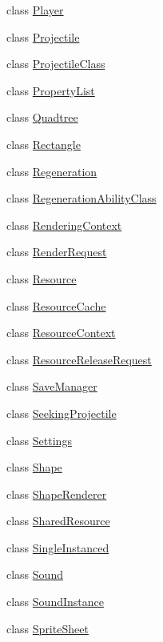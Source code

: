 \begin{DoxyCompactItemize}
\item 
class \hyperlink{classZeta_1_1Player}{Player}
\item 
class \hyperlink{classZeta_1_1Projectile}{Projectile}
\item 
class \hyperlink{classZeta_1_1ProjectileClass}{Projectile\+Class}
\item 
class \hyperlink{classZeta_1_1PropertyList}{Property\+List}
\item 
class \hyperlink{classZeta_1_1Quadtree}{Quadtree}
\item 
class \hyperlink{classZeta_1_1Rectangle}{Rectangle}
\item 
class \hyperlink{classZeta_1_1Regeneration}{Regeneration}
\item 
class \hyperlink{classZeta_1_1RegenerationAbilityClass}{Regeneration\+Ability\+Class}
\item 
class \hyperlink{classZeta_1_1RenderingContext}{Rendering\+Context}
\item 
class \hyperlink{classZeta_1_1RenderRequest}{Render\+Request}
\item 
class \hyperlink{classZeta_1_1Resource}{Resource}
\item 
class \hyperlink{classZeta_1_1ResourceCache}{Resource\+Cache}
\item 
class \hyperlink{classZeta_1_1ResourceContext}{Resource\+Context}
\item 
class \hyperlink{classZeta_1_1ResourceReleaseRequest}{Resource\+Release\+Request}
\item 
class \hyperlink{classZeta_1_1SaveManager}{Save\+Manager}
\item 
class \hyperlink{classZeta_1_1SeekingProjectile}{Seeking\+Projectile}
\item 
class \hyperlink{classZeta_1_1Settings}{Settings}
\item 
class \hyperlink{classZeta_1_1Shape}{Shape}
\item 
class \hyperlink{classZeta_1_1ShapeRenderer}{Shape\+Renderer}
\item 
class \hyperlink{classZeta_1_1SharedResource}{Shared\+Resource}
\item 
class \hyperlink{classZeta_1_1SingleInstanced}{Single\+Instanced}
\item 
class \hyperlink{classZeta_1_1Sound}{Sound}
\item 
class \hyperlink{classZeta_1_1SoundInstance}{Sound\+Instance}
\item 
class \hyperlink{classZeta_1_1SpriteSheet}{Sprite\+Sheet}
\item 

\end{DoxyCompactItemize}
